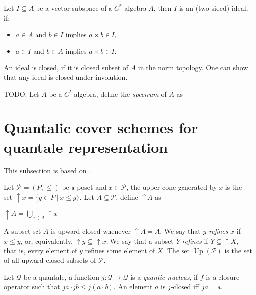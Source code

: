 \documentclass[a4paper]{article}
\theoremstyle{defin}
\theoremstyle{theorem}
\theoremstyle{claim}
\theoremstyle{prop}
\theoremstyle{lemma}
\theoremstyle{fact}
\theoremstyle{ex}
\theoremstyle{col}
\begin{document}
Let $I \subseteq A$ be a vector subspace of a $C^*$-algebra $A$, then $I$ is an (two-sided) ideal, if:
\begin{itemize}
\item $a \in A$ and $b \in I$ implies $a \times b \in I$,
\item $a \in I$ and $b \in A$ implies $a \times b \in I$.
\end{itemize}
An ideal is closed, if it is closed subset of $A$ in the norm topology. One can show that any ideal is closed under involution.

TODO: Let $A$ be a $C^*$-algebra, define the \emph{spectrum} of $A$ as

\section{Quantalic cover schemes for quantale representation}

This subsection is based on \cite{goldblatt2006kripke}.

Let $\mathcal{P} = (P, \leq)$ be a poset and $x \in \mathcal{P}$, the upper cone generated by $x$ is the set $\uparrow x = \{ y \in P \: | \: x \leq y \}$. Let $A \subseteq \mathcal{P}$, define $\uparrow A$ as
\begin{center}
$\uparrow A = \bigcup \limits_{x \in A} \uparrow x$
\end{center}
A subset set $A$ is upward closed whenever $\uparrow A = A$.
We say that $y$ \emph{refines} $x$ if $x \leq y$, or, equivalently, $\uparrow y \subseteq \uparrow x$. We say that a subset $Y$ \emph{refines} if $Y \subseteq \uparrow X$, that is, every element of $y$ refines some element of $X$. The set $\operatorname{Up}(\mathcal{P})$ is the set of all upward closed subsets of $\mathcal{P}$.

Let $\mathcal{Q}$ be a quantale, a function $j : \mathcal{Q} \to \mathcal{Q}$ is a \emph{quantic nucleus}, if $f$ is a closure operator such that $j a \cdot j b \leq j (a \cdot b)$. An element $a$ is $j$-closed iff $j a = a$.
\end{document}

